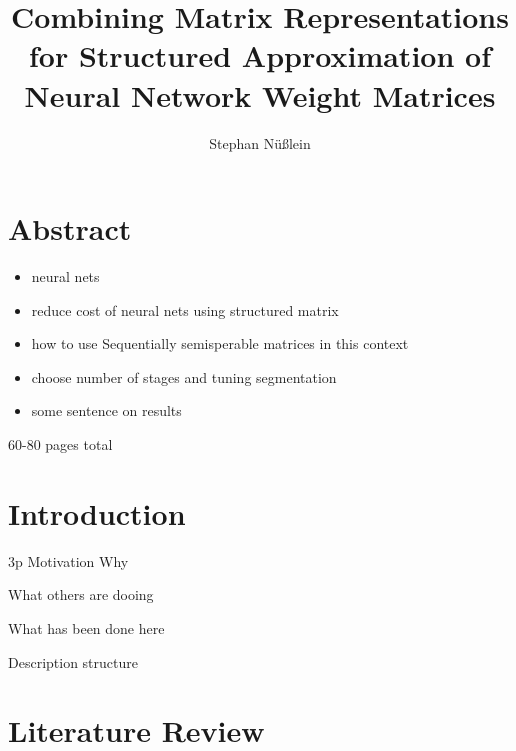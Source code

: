 \documentclass[doctype=mastersthesis,BCOR=15mm,biblatex]{ldvbook}%
\begin{document}
\title{Combining Matrix Representations for Structured Approximation of Neural Network Weight Matrices}
\author{Stephan Nüßlein}


\maketitle[frontcover=Design1]


\chapter*{Abstract}

\begin{itemize}
	\item neural nets
	\item reduce cost of neural nets using structured matrix
	\item how to use Sequentially semisperable matrices in this context
	\item choose number of stages and tuning segmentation
	\item some sentence on results
\end{itemize}


\tableofcontents

60-80 pages total







\chapter{Introduction} 3p
Motivation Why

What others are dooing

What has been done here


Description structure


\chapter{Literature Review}
\end{document}
